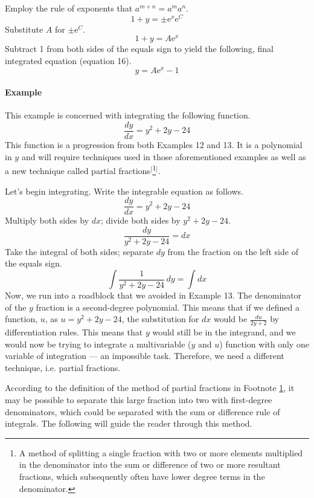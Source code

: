 \documentclass{article}
\newcounter{example}%
\newcommand{\ex}{\stepcounter{example} \paragraph{Example \theexample}}
\begin{document}
Employ the rule of exponents that $a^{m+n}=a^ma^n$.
\begin{equation*}
    1+y=\pm\text{e}^x\text{e}^C
\end{equation*}
Substitute $A$ for $\pm\text{e}^C$.
\begin{equation*}
    1+y=A\text{e}^x
\end{equation*}
Subtract 1 from both sides of the equals sign to yield the following, final integrated equation (equation 16).
\begin{equation}
    y=A\text{e}^x-1
\end{equation}
\ex This example is concerned with integrating the following function.$$\frac{dy}{dx}=y^2+2y-24$$
This function is a progression from both Examples 12 and 13. It is a polynomial in $y$ and will require techniques used in those aforementioned examples as well as a new technique called partial fractions$^[$\footnote{\label{fot:1}A method of splitting a single fraction with two or more elements multiplied in the denominator into the sum or difference of two or more resultant fractions, which subsequently often have lower degree terms in the denominator.}$^]$.\par
Let's begin integrating. Write the integrable equation as follows.
\begin{equation*}
    \frac{dy}{dx}=y^2+2y-24
\end{equation*}
Multiply both sides by $dx$; divide both sides by $y^2+2y-24$.
\begin{equation*}
    \frac{dy}{y^2+2y-24}=dx
\end{equation*}
Take the integral of both sides; separate $dy$ from the fraction on the left side of the equals sign.
\begin{equation}
    \int \frac{1}{y^2+2y-24}\, dy=\int dx
\end{equation}
Now, we run into a roadblock that we avoided in Example 13. The denominator of the $y$ fraction is a second-degree polynomial. This means that if we defined a function, $u$, as $u=y^2+2y-24$, the substitution for $dx$ would be $\frac{du}{2y+2}$ by differentiation rules. This means that $y$ would still be in the integrand, and we would now be trying to integrate a multivariable ($y$ and $u$) function with only one variable of integration --- an impossible task. Therefore, we need a different technique, i.e. partial fractions.\par
According to the definition of the method of partial fractions in Footnote \ref{fot:1}, it may be possible to separate this large fraction into two with first-degree denominators, which could be separated with the sum or difference rule of integrals. The following will guide the reader through this method.\par
\end{document}
